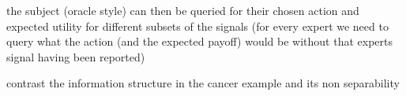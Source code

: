 the subject (oracle style) can then be queried for their chosen action and expected utility for different subsets of the signals (for every expert we need to query what the action (and the expected payoff) would be without that experts signal having been reported)

contrast the information structure in the cancer example and its non separability 


